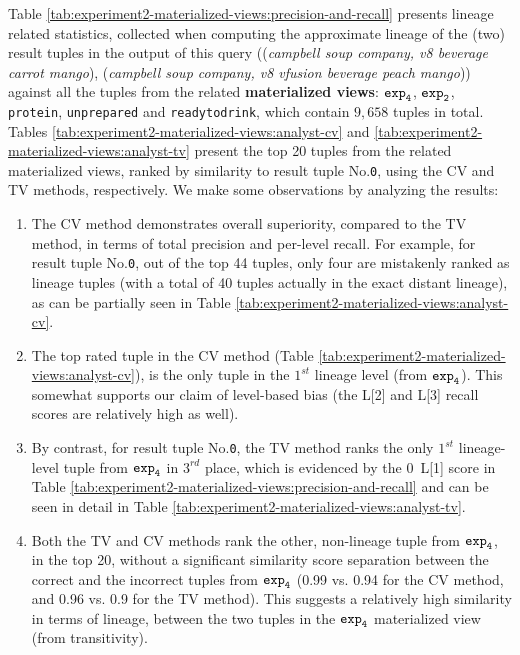 \begin{experiment-withrun}


Table \ref{tab:experiment2-materialized-views:precision-and-recall} presents lineage related statistics, collected when computing the approximate lineage of the (two) result tuples in the output of this query ((\textit{campbell soup company, v8 beverage carrot mango}), (\textit{campbell soup company, v8 vfusion beverage peach mango})) against all the tuples from the related \textbf{materialized views}: $\texttt{exp}\sb\texttt{4}$, $\texttt{exp}\sb\texttt{2}$, \texttt{protein}, \texttt{unprepared} and \texttt{readytodrink}, which contain $9,658$ tuples in total. Tables \ref{tab:experiment2-materialized-views:analyst-cv} and \ref{tab:experiment2-materialized-views:analyst-tv} present the top 20 tuples from the related materialized views, ranked by similarity to result tuple No.\texttt{0}, using the CV and TV methods, respectively. We make some observations by analyzing the results:
\begin{enumerate}
    \item The CV method demonstrates overall superiority, compared to the TV method, in terms of total precision and per-level recall. For example, for result tuple No.\texttt{0}, out of the top 44 tuples, only four are mistakenly ranked as lineage tuples (with a total of 40 tuples actually in the exact distant lineage), as can be partially seen in Table \ref{tab:experiment2-materialized-views:analyst-cv}.
    \item The top rated tuple in the CV method (Table \ref{tab:experiment2-materialized-views:analyst-cv}), is the only tuple in the $1^{st}$ lineage level (from $\texttt{exp}\sb\texttt{4}$). This somewhat supports our claim of level-based bias (the L[2] and L[3] recall scores are relatively high as well).
    \item By contrast, for result tuple No.\texttt{0}, the TV method ranks the only $1^{st}$ lineage-level tuple from $\texttt{exp}\sb\texttt{4}$ in $3^{rd}$ place, which is evidenced by the 0\footnotemark\, L[1] score in Table \ref{tab:experiment2-materialized-views:precision-and-recall} and can be seen in detail in Table \ref{tab:experiment2-materialized-views:analyst-tv}.
    \item Both the TV and CV methods rank the other, non-lineage tuple from $\texttt{exp}\sb\texttt{4}$, in the top 20, without a significant similarity score separation between the correct and the incorrect tuples from $\texttt{exp}\sb\texttt{4}$ (0.99 vs. 0.94 for the CV method, and 0.96 vs. 0.9 for the TV method). This suggests a relatively high similarity in terms of lineage, between the two tuples in the $\texttt{exp}\sb\texttt{4}$ materialized view (from transitivity).
\end{enumerate}


\end{experiment-withrun}
